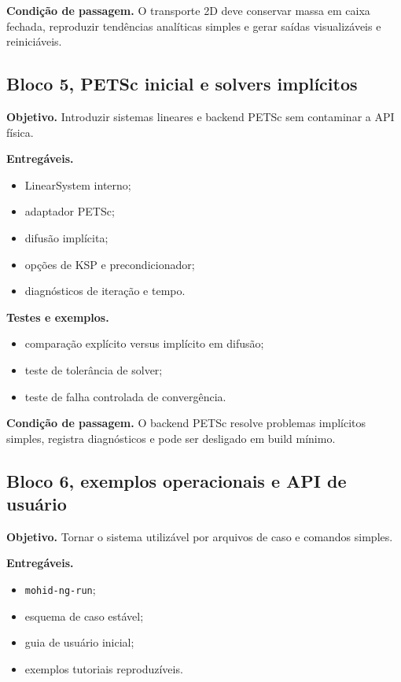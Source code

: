 \documentclass[11pt,a4paper]{article}
\begin{document}
\textbf{Condi\c{c}\~ao de passagem.} O transporte 2D deve conservar massa em caixa fechada, reproduzir tend\^encias anal\'iticas simples e gerar sa\'idas visualiz\'aveis e reinici\'aveis.

\subsection*{Bloco 5, PETSc inicial e solvers impl\'icitos}

\textbf{Objetivo.} Introduzir sistemas lineares e backend PETSc sem contaminar a API f\'isica.

\textbf{Entreg\'aveis.}
\begin{itemize}
  \item LinearSystem interno;
  \item adaptador PETSc;
  \item difus\~ao impl\'icita;
  \item op\c{c}\~oes de KSP e precondicionador;
  \item diagn\'osticos de itera\c{c}\~ao e tempo.
\end{itemize}

\textbf{Testes e exemplos.}
\begin{itemize}
  \item compara\c{c}\~ao expl\'icito versus impl\'icito em difus\~ao;
  \item teste de toler\^ancia de solver;
  \item teste de falha controlada de converg\^encia.
\end{itemize}

\textbf{Condi\c{c}\~ao de passagem.} O backend PETSc resolve problemas impl\'icitos simples, registra diagn\'osticos e pode ser desligado em build m\'inimo.

\subsection*{Bloco 6, exemplos operacionais e API de usu\'ario}

\textbf{Objetivo.} Tornar o sistema utiliz\'avel por arquivos de caso e comandos simples.

\textbf{Entreg\'aveis.}
\begin{itemize}
  \item \texttt{mohid-ng-run};
  \item esquema de caso est\'avel;
  \item guia de usu\'ario inicial;
  \item exemplos tutoriais reproduz\'iveis.
\end{itemize}
\end{document}

